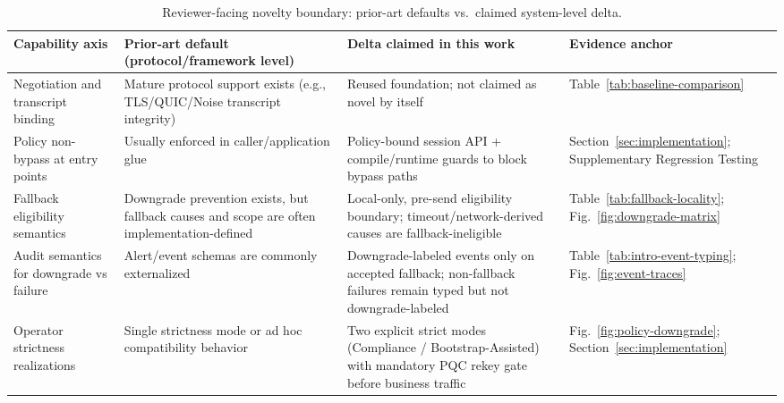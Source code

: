 \begin{table}[!t]
\centering
\scriptsize
\caption{Reviewer-facing novelty boundary: prior-art defaults vs.\ claimed system-level delta.}
\label{tab:novelty-delta}
\begin{tabular}{@{}
  >{\raggedright\arraybackslash}p{}
  >{\raggedright\arraybackslash}p{}
  >{\raggedright\arraybackslash}p{}
  >{\raggedright\arraybackslash}p{}@{}}
\toprule
Capability axis & Prior-art default (protocol/framework level) & Delta claimed in this work & Evidence anchor \\
\midrule
Negotiation and transcript binding & Mature protocol support exists (e.g., TLS/QUIC/Noise transcript integrity) & Reused foundation; not claimed as novel by itself & Table~\ref{tab:baseline-comparison} \\
Policy non-bypass at entry points & Usually enforced in caller/application glue & Policy-bound session API + compile/runtime guards to block bypass paths & Section~\ref{sec:implementation}; Supplementary Regression Testing \\
Fallback eligibility semantics & Downgrade prevention exists, but fallback causes and scope are often implementation-defined & Local-only, pre-send eligibility boundary; timeout/network-derived causes are fallback-ineligible & Table~\ref{tab:fallback-locality}; Fig.~\ref{fig:downgrade-matrix} \\
Audit semantics for downgrade vs failure & Alert/event schemas are commonly externalized & Downgrade-labeled events only on accepted fallback; non-fallback failures remain typed but not downgrade-labeled & Table~\ref{tab:intro-event-typing}; Fig.~\ref{fig:event-traces} \\
Operator strictness realizations & Single strictness mode or ad hoc compatibility behavior & Two explicit strict modes (Compliance / Bootstrap-Assisted) with mandatory PQC rekey gate before business traffic & Fig.~\ref{fig:policy-downgrade}; Section~\ref{sec:implementation} \\
\bottomrule
\end{tabular}
\end{table}


